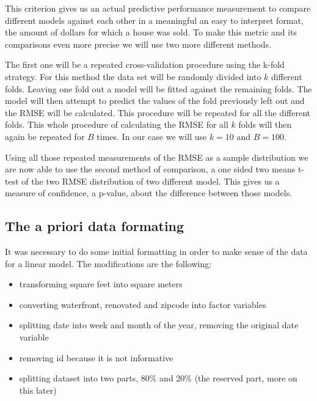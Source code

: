\documentclass[table]{article}
\providecommand{\tightlist}{%
  \setlength{\itemsep}{0pt}\setlength{\parskip}{0pt}}
\begin{document}
This criterion gives us an actual predictive performance measurement to
compare different models against each other in a meaningful an easy to
interpret format, the amount of dollars for which a house was sold. To
make this metric and its comparisons even more precise we will use two
more different methods.

The first one will be a repeated cross-validation procedure using the
k-fold strategy. For this method the data set will be randomly divided
into \(k\) different folds. Leaving one fold out a model will be fitted
against the remaining folds. The model will then attempt to predict the
values of the fold previously left out and the RMSE will be calculated.
This procedure will be repeated for all the different folds. This whole
procedure of calculating the RMSE for all \(k\) folds will then again be
repeated for \(B\) times. In our case we will use \(k = 10\) and
\(B = 100\).

Using all those repeated measurements of the RMSE as a sample
distribution we are now able to use the second method of comparison, a
one sided two means t-test of the two RMSE distribution of two different
model. This gives us a measure of confidence, a p-value, about the
difference between those models.

\subsection{The a priori data
formating}\label{the-a-priori-data-formating}

It was necessary to do some initial formatting in order to make sense of
the data for a linear model. The modifications are the following:

\begin{itemize}
\tightlist
\item
  transforming square feet into square meters
\item
  converting waterfront, renovated and zipcode into factor variables
\item
  splitting date into week and month of the year, removing the original
  date variable
\item
  removing id because it is not informative
\item
  splitting dataset into two parts, 80\% and 20\% (the reserved part,
  more on this later) \hfill\break
\end{itemize}
\end{document}
